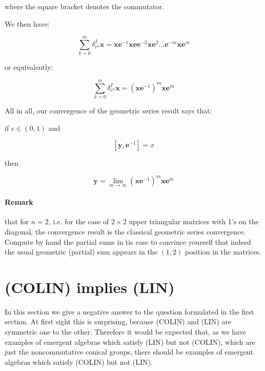 \documentclass{article}
\begin{document}
where the square bracket denotes the commutator. 



We then have: 







$$ \sum_{k=0}^{m} \delta_{e^{k}}^{I} \mathbf{x} = \mathbf{x}\mathbf{e}^{-1} \mathbf{x} \mathbf{e} \mathbf{e}^{-2} \mathbf{x} \mathbf{e}^{2} ... \mathbf{e}^{-m} \mathbf{x} \mathbf{e}^{m}$$



or equivalently: 



$$ \sum_{k=0}^{m} \delta_{e^{k}}^{I} \mathbf{x} = (\mathbf{x} \mathbf{e}^{-1})^{m} \mathbf{x} \mathbf{e}^{m}$$



All in all, our convergence of the geometric series result says that:



 if $e \in (0,1)$ and 



$$ [\mathbf{y}, \mathbf{e}^{-1}] = x$$



then 



$$ \mathbf{y} = \lim_{m \rightarrow \infty}  (\mathbf{x} \mathbf{e}^{-1})^{m} \mathbf{x} \mathbf{e}^{m}$$



\paragraph{Remark} that for $n=2$, i.e. for the case of $2 \times 2$ upper triangular matrices with 1's on the diagonal, the convergence result is the classical geometric series convergence. Compute by hand the partial sums in tis case to convince yourself that indeed the usual geometric (partial) sum appears in the $(1,2)$ position in the matrices. 



\section{(COLIN) implies (LIN)}

In this section we give a negative answer to the question formulated in the first section. At first sight this is surprising, because (COLIN) and (LIN) are symmetric one to the other. Therefore it would be expected that, as we have examples of emergent algebras which satisfy (LIN) but not (COLIN), which are just the noncommutative conical groups, there should be examples of emergent algebras which satisfy (COLIN) but not (LIN). 
\end{document}
